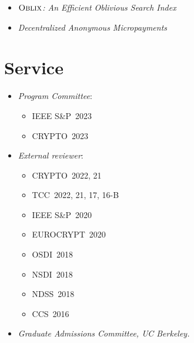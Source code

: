 \documentclass[11pt]{article}
\begin{document}
\begin{cv}{\vspace{-5em}}
\begin{itemize}[itemsep=1.25em]
    \item[] \emph{$\textsc{Oblix}$: An Efficient Oblivious Search Index}

    \item[] \emph{Decentralized Anonymous Micropayments} 
  \end{itemize}

{\section*{Service}}
  \begin{itemize}
    \small
    \item [] \emph{Program Committee}: 
    \begin{itemize}
      \item IEEE S\&P~2023
      \item CRYPTO~2023
    \end{itemize}
    \item[] \emph{External reviewer}:
      \begin{itemize}
        \item CRYPTO~2022, 21
        \item TCC~2022, 21, 17, 16-B
        \item IEEE S\&P~2020
        \item EUROCRYPT~2020
        \item OSDI~2018
        \item NSDI~2018
        \item NDSS~2018
        \item CCS~2016
      \end{itemize}

    \item[] \emph{Graduate Admissions Committee, UC Berkeley.}
  \end{itemize}
\end{cv}
\end{document}
